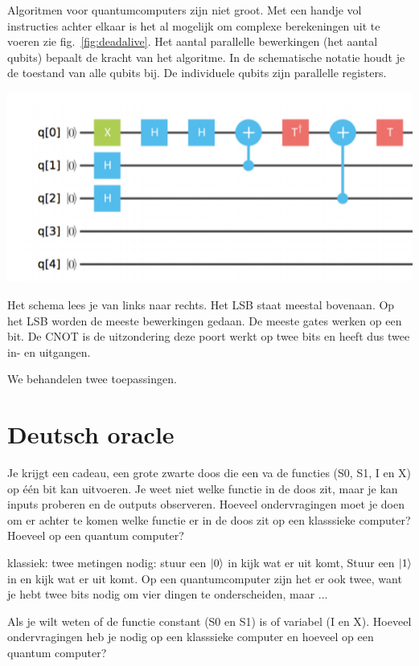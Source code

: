 \documentclass[../../main.tex]{subfiles}
\begin{document}
Algoritmen voor quantumcomputers zijn niet groot. Met een handje vol instructies achter elkaar is het al mogelijk om complexe berekeningen uit te voeren zie fig.~\ref{fig:deadalive}. Het aantal parallelle bewerkingen (het aantal qubits) bepaalt de kracht van het algoritme. In de schematische notatie houdt je de toestand van alle qubits bij. De individuele qubits zijn parallelle registers.


\begin{center}
\leavevmode
\includegraphics[width=.9\linewidth]{./img/quantumalgoritme.PNG}
\end{center}

Het schema lees je van links naar rechts. Het LSB staat meestal bovenaan. Op het LSB worden de meeste bewerkingen gedaan. De meeste gates werken op een bit. De CNOT is de uitzondering deze poort werkt op twee bits en heeft dus twee in- en uitgangen. 

We behandelen twee toepassingen.

\section*{Deutsch oracle}
Je krijgt een cadeau, een grote zwarte doos die een va de functies (S0, S1, I en X)  op \'e\'en bit kan uitvoeren. Je weet niet welke functie in de doos zit, maar je kan inputs proberen en de outputs observeren. Hoeveel ondervragingen moet je doen om er achter te komen welke functie er in de doos zit op een klasssieke computer? Hoeveel op een quantum computer?

klassiek: twee metingen nodig:
stuur een $\ket{0}$ in kijk wat er uit komt, Stuur een $\ket{1}$
in en kijk wat er uit komt. 
Op een quantumcomputer zijn het er ook twee, want je hebt twee bits nodig om vier dingen te onderscheiden, maar ...

Als je wilt weten of de functie constant (S0 en S1) is of variabel (I en X). Hoeveel ondervragingen heb je nodig op een klasssieke computer en hoeveel op een quantum computer?
\end{document}
